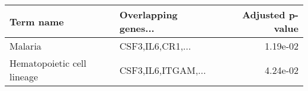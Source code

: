 \begin{tabular}{llr}
\toprule
                 Term name & Overlapping genes... &  Adjusted p-value \\
\midrule
                   Malaria &     CSF3,IL6,CR1,... &          1.19e-02 \\
Hematopoietic cell lineage &   CSF3,IL6,ITGAM,... &          4.24e-02 \\
\bottomrule
\end{tabular}
